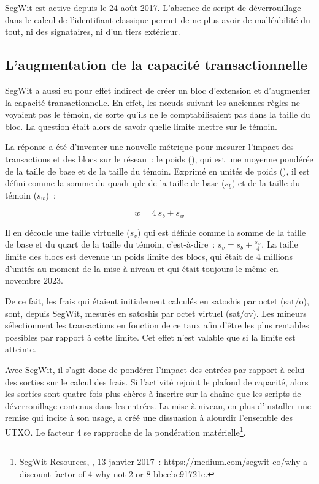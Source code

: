 SegWit est active depuis le 24 août 2017. L'absence de script de déverrouillage dans le calcul de l'identifiant classique permet de ne plus avoir de malléabilité du tout, ni des signataires, ni d'un tiers extérieur.

\subsection{L'augmentation de la capacité transactionnelle} SegWit a aussi eu pour effet indirect de créer un bloc d'extension et d'augmenter la capacité transactionnelle. En effet, les nœuds suivant les anciennes règles ne voyaient pas le témoin, de sorte qu'ils ne le comptabilisaient pas dans la taille du bloc. La question était alors de savoir quelle limite mettre sur le témoin.

La réponse a été d'inventer une nouvelle métrique pour mesurer l'impact des transactions et des blocs sur le réseau~: le poids (), qui est une moyenne pondérée de la taille de base et de la taille du témoin. Exprimé en unités de poids (), il est défini comme la somme du quadruple de la taille de base ($s_b$) et de la taille du témoin ($s_w$)~:

{ \footnotesize
\[
w = 4 ~ s_b + s_w
\]
}

Il en découle une taille virtuelle ($s_v$) qui est définie comme la somme de la taille de base et du quart de la taille du témoin, c'est-à-dire~: $s_v = s_b + \frac{s_w}{4}$. La taille limite des blocs est devenue un poids limite des blocs, qui était de 4 millions d'unités au moment de la mise à niveau et qui était toujours le même en novembre 2023.

De ce fait, les frais qui étaient initialement calculés en satoshis par octet (sat/o), sont, depuis SegWit, mesurés en satoshis par octet virtuel (sat/ov). Les mineurs sélectionnent les transactions en fonction de ce taux afin d'être les plus rentables possibles par rapport à cette limite. Cet effet n'est valable que si la limite est atteinte.

Avec SegWit, il s'agit donc de pondérer l'impact des entrées par rapport à celui des sorties sur le calcul des frais. Si l'activité rejoint le plafond de capacité, alors les sorties sont quatre fois plus chères à inscrire sur la chaîne que les scripts de déverrouillage contenus dans les entrées. La mise à niveau, en plus d'installer une remise qui incite à son usage, a créé une dissuasion à alourdir l'ensemble des UTXO. Le facteur 4 se rapproche de la pondération matérielle\footnote{SegWit Resources, , 13 janvier 2017~: \url{https://medium.com/segwit-co/why-a-discount-factor-of-4-why-not-2-or-8-bbcebe91721e}.}.

